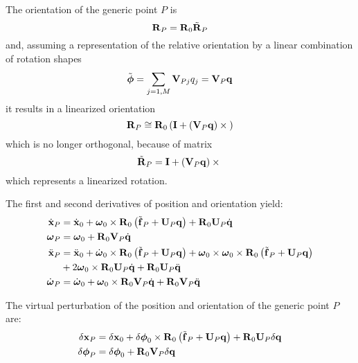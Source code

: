 The orientation of the generic point $P$ is
\begin{equation}
	\bm{\mathbf{R}}_P = \bm{\mathbf{R}}_0 \tilde{\bm{\mathbf{R}}}_P
\end{equation}
and, assuming a representation of the relative orientation by a linear
combination of rotation shapes
\begin{equation}
	\tilde{\bm{\mathbf{\phi}}} = \sum_{j=1,M} \bm{\mathbf{V}}_{Pj} q_j = \bm{\mathbf{V}}_P \bm{\mathbf{q}}
\end{equation}
it results in a linearized orientation
\begin{equation}
	\bm{\mathbf{R}}_P \cong \bm{\mathbf{R}}_0 \left( \bm{\mathbf{I}} + \left( \bm{\mathbf{V}}_P \bm{\mathbf{q}} \right)\times{} \right)
\end{equation}
which is no longer orthogonal, because of matrix
\begin{equation}
	\tilde{\bm{\mathbf{R}}}_P = \bm{\mathbf{I}} + \left( \bm{\mathbf{V}}_P \bm{\mathbf{q}} \right)\times{}
\end{equation}
which represents a linearized rotation.

The first and second derivatives of position and orientation yield:
\begin{subequations}
\begin{align}
	\dot{\bm{\mathbf{x}}}_P &= \dot{\bm{\mathbf{x}}}_0
		+ \bm{\mathbf{\omega}}_0 \times \bm{\mathbf{R}}_0 \left( \tilde{\bm{\mathbf{f}}}_P + \bm{\mathbf{U}}_P \bm{\mathbf{q}} \right)
		+ \bm{\mathbf{R}}_0 \bm{\mathbf{U}}_P \dot{\bm{\mathbf{q}}} \\
	\bm{\mathbf{\omega}}_P &= \bm{\mathbf{\omega}}_0
		+ \bm{\mathbf{R}}_0 \bm{\mathbf{V}}_P \dot{\bm{\mathbf{q}}} \\
	\ddot{\bm{\mathbf{x}}}_P &= \ddot{\bm{\mathbf{x}}}_0
		+ \dot{\bm{\mathbf{\omega}}}_0 \times \bm{\mathbf{R}}_0 \left( \tilde{\bm{\mathbf{f}}}_P + \bm{\mathbf{U}}_P \bm{\mathbf{q}} \right)
		+ \bm{\mathbf{\omega}}_0 \times \bm{\mathbf{\omega}}_0 \times \bm{\mathbf{R}}_0 \left( \tilde{\bm{\mathbf{f}}}_P + \bm{\mathbf{U}}_P \bm{\mathbf{q}} \right) \nonumber \\
		& \mbox{} + 2 \bm{\mathbf{\omega}}_0 \times \bm{\mathbf{R}}_0 \bm{\mathbf{U}}_P \dot{\bm{\mathbf{q}}}
		+ \bm{\mathbf{R}}_0 \bm{\mathbf{U}}_P \ddot{\bm{\mathbf{q}}} \\
	\dot{\bm{\mathbf{\omega}}}_P &= \dot{\bm{\mathbf{\omega}}}_0
		+ \bm{\mathbf{\omega}}_0 \times \bm{\mathbf{R}}_0 \bm{\mathbf{V}}_P \dot{\bm{\mathbf{q}}}
		+ \bm{\mathbf{R}}_0 \bm{\mathbf{V}}_P \ddot{\bm{\mathbf{q}}}
\end{align}
\end{subequations}

The virtual perturbation of the position and orientation
of the generic point $P$ are:
\begin{subequations}
\begin{align}
	\delta{\bm{\mathbf{x}}}_P &= \delta{\bm{\mathbf{x}}}_0
		+ \delta\bm{\mathbf{\phi}}_0 \times \bm{\mathbf{R}}_0 \left( \tilde{\bm{\mathbf{f}}}_P + \bm{\mathbf{U}}_P \bm{\mathbf{q}} \right)
		+ \bm{\mathbf{R}}_0 \bm{\mathbf{U}}_P \delta{\bm{\mathbf{q}}} \\
	\delta\bm{\mathbf{\phi}}_P &= \delta\bm{\mathbf{\phi}}_0
		+ \bm{\mathbf{R}}_0 \bm{\mathbf{V}}_P \delta{\bm{\mathbf{q}}}
\end{align}
\end{subequations}

